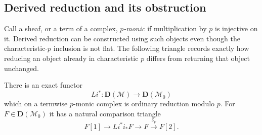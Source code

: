 \subsection{Derived reduction and its obstruction}

Call a sheaf, or a term of a complex, \emph{$p$-monic} if multiplication
by $p$ is injective on it. Derived reduction can be constructed using
such objects even though the characteristic-$p$ inclusion is not flat.
The following triangle records exactly how reducing an object already
in characteristic $p$ differs from returning that object unchanged.

\begin{lemma}
\label{transfer:reduction}
There is an exact functor
\[
 Li^*:\mathbf D(\mathcal M)\longrightarrow
                 \mathbf D(\mathcal M_0)
\]
which on a termwise $p$-monic complex is ordinary reduction modulo $p$.
For $F\in\mathbf D(\mathcal M_0)$ it has a natural comparison triangle
\begin{equation}
 F[1]\longrightarrow Li^*i_*F\longrightarrow F
      \xrightarrow{\delta_F}F[2].
 \label{transfer:reduction-triangle}
\end{equation}
\end{lemma}


